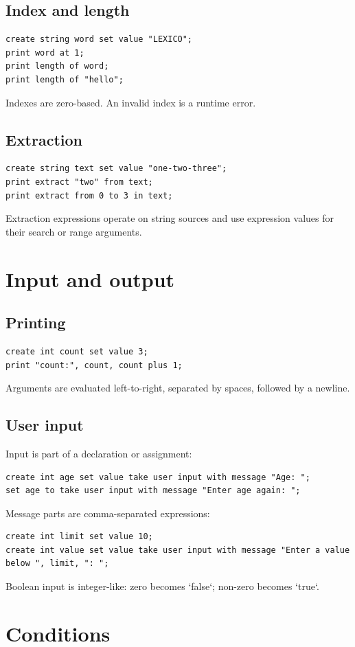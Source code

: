 \documentclass[10.5pt,a4paper]{article}
\begin{document}
\subsection{Index and length}
\begin{lstlisting}
create string word set value "LEXICO";
print word at 1;
print length of word;
print length of "hello";
\end{lstlisting}
Indexes are zero-based. An invalid index is a runtime error.
\subsection{Extraction}
\begin{lstlisting}
create string text set value "one-two-three";
print extract "two" from text;
print extract from 0 to 3 in text;
\end{lstlisting}
Extraction expressions operate on string sources and use expression values for their search or range arguments.
\section{Input and output}
\subsection{Printing}
\begin{lstlisting}
create int count set value 3;
print "count:", count, count plus 1;
\end{lstlisting}
Arguments are evaluated left-to-right, separated by spaces, followed by a newline.
\subsection{User input}
Input is part of a declaration or assignment:
\begin{lstlisting}
create int age set value take user input with message "Age: ";
set age to take user input with message "Enter age again: ";
\end{lstlisting}
Message parts are comma-separated expressions:
\begin{lstlisting}
create int limit set value 10;
create int value set value take user input with message "Enter a value below ", limit, ": ";
\end{lstlisting}
Boolean input is integer-like: zero becomes `false`; non-zero becomes `true`.
\section{Conditions}
\end{document}
